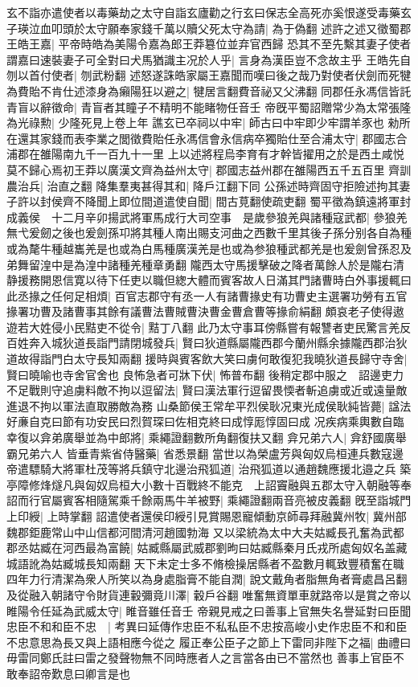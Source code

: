 玄不詣亦遣使者以毒藥劫之太守自詣玄廬勸之行玄曰保志全高死亦奚恨遂受毒藥玄子瑛泣血叩頭於太守願奉家錢千萬以贖父死太守為請|{
	為于偽翻}
述許之述又徵蜀郡王皓王嘉|{
	平帝時皓為美陽令嘉為郎王莽簒位並弃官西歸}
恐其不至先繫其妻子使者謂嘉曰速裝妻子可全對曰犬馬猶識主况於人乎|{
	言身為漢臣豈不念故主乎}
王皓先自刎以首付使者|{
	刎武粉翻}
述怒遂誅皓家屬王嘉聞而嘆曰後之哉乃對使者伏劍而死犍為費貽不肯仕述漆身為癩陽狂以避之|{
	犍居言翻費音祕又父沸翻}
同郡任永馮信皆託青盲以辭徵命|{
	青盲者其瞳子不精明不能睹物任音壬}
帝旣平蜀詔贈常少為太常張隆為光祿勲|{
	少隆死見上卷上年}
譙玄已卒祠以中牢|{
	師古曰中牢即少牢謂羊豕也}
勑所在還其家錢而表李業之閭徵費貽任永馮信會永信病卒獨貽仕至合浦太守|{
	郡國志合浦郡在雒陽南九千一百九十一里}
上以述將程烏李育有才幹皆擢用之於是西土咸悦莫不歸心焉初王莽以廣漢文齊為益州太守|{
	郡國志益州郡在雒陽西五千五百里}
齊訓農治兵|{
	治直之翻}
降集羣夷甚得其和|{
	降戶江翻下同}
公孫述時齊固守拒險述拘其妻子許以封侯齊不降聞上即位間道遣使自聞|{
	間古莧翻使疏吏翻}
蜀平徵為鎮遠將軍封成義侯　十二月辛卯揚武將軍馬成行大司空事　是歲參狼羌與諸種寇武都|{
	參狼羌無弋爰劒之後也爰劍孫卭將其種人南出賜支河曲之西數千里其後子孫分别各自為種或為氂牛種越巂羌是也或為白馬種廣漢羌是也或為参狼種武都羌是也爰劍曾孫忍及弟舞留湟中是為湟中諸種羌種章勇翻}
隴西太守馬援擊破之降者萬餘人於是隴右清静援務開恩信寛以待下任吏以職但緫大體而賓客故人日滿其門諸曹時白外事援輒曰此丞掾之任何足相煩|{
	百官志郡守有丞一人有諸曹掾史有功曹史主選署功勞有五官掾署功曹及諸曹事其餘有議曹法曹賊曹決曹金曹倉曹等掾俞絹翻}
頗哀老子使得遨遊若大姓侵小民黠吏不從令|{
	黠丁八翻}
此乃太守事耳傍縣嘗有報讐者吏民驚言羌反百姓奔入城狄道長詣門請閉城發兵|{
	賢曰狄道縣屬隴西郡今蘭州縣余據隴西郡治狄道故得詣門白太守長知兩翻}
援時與賓客飲大笑曰虜何敢復犯我曉狄道長歸守寺舍|{
	賢曰曉喻也寺舍官舍也}
良怖急者可牀下伏|{
	怖普布翻}
後稍定郡中服之　詔邊吏力不足戰則守追虜料敵不拘以逗留法|{
	賢曰漢法軍行逗留畏愞者斬追虜或近或遠量敵進退不拘以軍法直取勝敵為務}
山桑節侯王常牟平烈侯耿况東光成侯耿純皆薨|{
	諡法好亷自克曰節有功安民曰烈賀琛曰佐相克終曰成惇厖惇固曰成}
况疾病乘輿數自臨幸復以弇弟廣舉並為中郎將|{
	乘繩證翻數所角翻復扶又翻}
弇兄弟六人|{
	弇舒國廣舉霸兄弟六人}
皆垂青紫省侍醫藥|{
	省悉景翻}
當世以為榮盧芳與匈奴烏桓連兵數寇邊帝遣驃騎大將軍杜茂等將兵鎮守北邊治飛狐道|{
	治飛狐道以通趙魏應援北邉之兵}
築亭障修烽燧凡與匈奴烏桓大小數十百戰終不能克　上詔竇融與五郡太守入朝融等奉詔而行官屬賓客相隨駕乘千餘兩馬牛羊被野|{
	乘繩證翻兩音亮被皮義翻}
旣至詣城門上印綬|{
	上時掌翻}
詔遣使者還侯印綬引見賞賜恩寵傾動京師尋拜融冀州牧|{
	冀州部魏郡鉅鹿常山中山信都河間清河趙國勃海}
又以梁統為太中大夫姑臧長孔奮為武都郡丞姑臧在河西最為富饒|{
	姑臧縣屬武威郡劉昫曰姑臧縣秦月氏戎所處匈奴名盖藏城語訛為姑臧城長知兩翻}
天下未定士多不脩檢操居縣者不盈數月輒致豐積奮在職四年力行清潔為衆人所笑以為身處脂膏不能自潤|{
	說文戴角者脂無角者膏處昌呂翻}
及從融入朝諸守令財貨連轂彌竟川澤|{
	轂戶谷翻}
唯奮無資單車就路帝以是賞之帝以睢陽令任延為武威太守|{
	睢音雖任音壬}
帝親見戒之曰善事上官無失名譽延對曰臣聞忠臣不和和臣不忠　|{
	考異曰延傳作忠臣不私私臣不忠按高峻小史作忠臣不和和臣不忠意思為長又與上語相應今從之}
履正奉公臣子之節上下雷同非陛下之福|{
	曲禮曰毋雷同鄭氏註曰雷之發聲物無不同時應者人之言當各由已不當然也}
善事上官臣不敢奉詔帝歎息曰卿言是也

